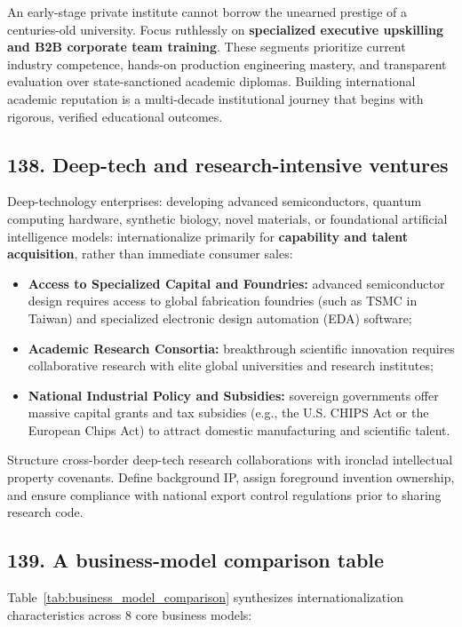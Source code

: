 An early-stage private institute cannot borrow the unearned prestige of a centuries-old university. Focus ruthlessly on \textbf{specialized executive upskilling and B2B corporate team training}. These segments prioritize current industry competence, hands-on production engineering mastery, and transparent evaluation over state-sanctioned academic diplomas. Building international academic reputation is a multi-decade institutional journey that begins with rigorous, verified educational outcomes.

\subsection{138. Deep-tech and research-intensive ventures}

Deep-technology enterprises: developing advanced semiconductors, quantum computing hardware, synthetic biology, novel materials, or foundational artificial intelligence models: internationalize primarily for \textbf{capability and talent acquisition}, rather than immediate consumer sales:
\begin{itemize}
    \item \textbf{Access to Specialized Capital and Foundries:} advanced semiconductor design requires access to global fabrication foundries (such as TSMC in Taiwan) and specialized electronic design automation (EDA) software;
    \item \textbf{Academic Research Consortia:} breakthrough scientific innovation requires collaborative research with elite global universities and research institutes;
    \item \textbf{National Industrial Policy and Subsidies:} sovereign governments offer massive capital grants and tax subsidies (e.g., the U.S. CHIPS Act or the European Chips Act) to attract domestic manufacturing and scientific talent.
\end{itemize}
Structure cross-border deep-tech research collaborations with ironclad intellectual property covenants. Define background IP, assign foreground invention ownership, and ensure compliance with national export control regulations prior to sharing research code.

\subsection{139. A business-model comparison table}

Table~\ref{tab:business_model_comparison} synthesizes internationalization characteristics across 8 core business models:

